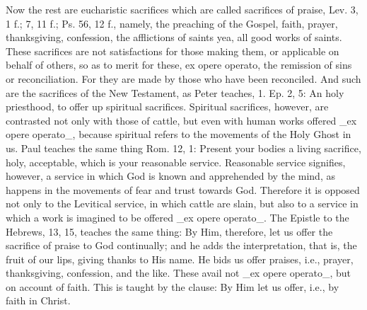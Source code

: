 Now the rest are eucharistic sacrifices which are called sacrifices
of praise, Lev. 3, 1 f.; 7, 11 f.; Ps. 56, 12 f., namely, the
preaching of the Gospel, faith, prayer, thanksgiving, confession, the
afflictions of saints yea, all good works of saints.  These
sacrifices are not satisfactions for those making them, or applicable
on behalf of others, so as to merit for these, ex opere operato, the
remission of sins or reconciliation.  For they are made by those who
have been reconciled.  And such are the sacrifices of the New
Testament, as Peter teaches, 1. Ep. 2, 5: An holy priesthood, to
offer up spiritual sacrifices.  Spiritual sacrifices, however, are
contrasted not only with those of cattle, but even with human works
offered _ex opere operato_, because spiritual refers to the movements
of the Holy Ghost in us.  Paul teaches the same thing Rom. 12, 1:
Present your bodies a living sacrifice, holy, acceptable, which is
your reasonable service.  Reasonable service signifies, however, a
service in which God is known and apprehended by the mind, as happens
in the movements of fear and trust towards God.  Therefore it is
opposed not only to the Levitical service, in which cattle are slain,
but also to a service in which a work is imagined to be offered _ex
opere operato_.  The Epistle to the Hebrews, 13, 15, teaches the same
thing: By Him, therefore, let us offer the sacrifice of praise to God
continually; and he adds the interpretation, that is, the fruit of
our lips, giving thanks to His name.  He bids us offer praises, i.e.,
prayer, thanksgiving, confession, and the like.  These avail not _ex
opere operato_, but on account of faith.  This is taught by the
clause: By Him let us offer, i.e., by faith in Christ.

